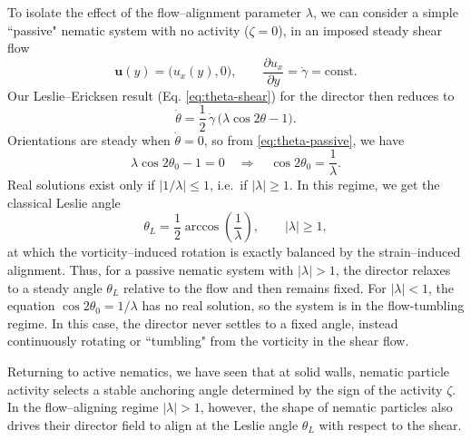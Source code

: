 \documentclass[11pt]{article}
\begin{document}
To isolate the effect of the flow–alignment parameter $\lambda$, we can consider a simple ``passive" nematic system with no activity ($\zeta = 0$), in an imposed steady shear flow
\begin{equation}
\mathbf{u}(y) = \big(u_x(y), 0\big), \qquad \frac{\partial u_x}{\partial y} = \dot\gamma = \text{const}.
\end{equation}
Our Leslie--Ericksen result (Eq. \eqref{eq:theta-shear}) for the director then reduces to 
\begin{equation}
\dot\theta
= \frac{1}{2}\,\dot\gamma\,\big(\lambda\cos 2\theta - 1\big).
\label{eq:theta-passive}
\end{equation}
Orientations are steady when $\dot\theta = 0$, so from \eqref{eq:theta-passive}, we have
$$
\lambda\cos 2\theta_0 - 1 = 0
\quad\Rightarrow\quad
\cos 2\theta_0 = \frac{1}{\lambda}.
$$
Real solutions exist only if $|1/\lambda|\le 1$, i.e.\ if $|\lambda|\ge 1$. In this regime, we get the classical Leslie angle~\cite{beris1994thermodynamics}
\begin{equation}
\theta_L = \frac{1}{2}\arccos\!\left(\frac{1}{\lambda}\right),
\qquad |\lambda|\ge 1,
\end{equation}
at which the vorticity–induced rotation is exactly balanced by the strain–induced alignment. Thus, for a passive nematic system with $|\lambda|>1$, the director relaxes to a steady angle $\theta_L$ relative to the flow and then remains fixed. For $|\lambda|<1$, the equation $\cos 2\theta_0 = 1/\lambda$ has no real solution, so the system is in the flow-tumbling regime. In this case, the director never settles to a fixed angle, instead continuously rotating or ``tumbling" from the vorticity in the shear flow. 

Returning to active nematics, we have seen that at solid walls, nematic particle activity selects a stable anchoring angle determined by the sign of the activity $\zeta$. In the flow–aligning regime $|\lambda|>1$, however, the shape of nematic particles also drives their director field to align at the Leslie angle $\theta_L$ with respect to the shear. 
\end{document}
